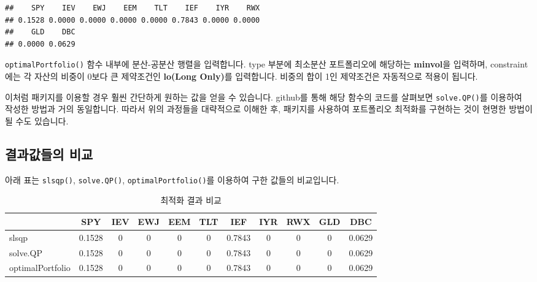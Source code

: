 \documentclass[12pt,]{book}
\newenvironment{Shaded}{\begin{snugshade}}{\end{snugshade}}
\newcommand{\DataTypeTok}[1]{\textcolor[rgb]{0.13,0.29,0.53}{#1}}
\newcommand{\DecValTok}[1]{\textcolor[rgb]{0.00,0.00,0.81}{#1}}
\newcommand{\KeywordTok}[1]{\textcolor[rgb]{0.13,0.29,0.53}{\textbf{#1}}}
\newcommand{\NormalTok}[1]{#1}
\newcommand{\OperatorTok}[1]{\textcolor[rgb]{0.81,0.36,0.00}{\textbf{#1}}}
\newcommand{\StringTok}[1]{\textcolor[rgb]{0.31,0.60,0.02}{#1}}
\begin{document}
\begin{Shaded}
\end{Shaded}

\begin{verbatim}
##    SPY    IEV    EWJ    EEM    TLT    IEF    IYR    RWX 
## 0.1528 0.0000 0.0000 0.0000 0.0000 0.7843 0.0000 0.0000 
##    GLD    DBC 
## 0.0000 0.0629
\end{verbatim}

\texttt{optimalPortfolio()} 함수 내부에 분산-공분산 행렬을 입력합니다. type 부분에 최소분산 포트폴리오에 해당하는 \textbf{minvol}을 입력하며, constraint에는 각 자산의 비중이 0보다 큰 제약조건인 \textbf{lo(Long Only)}를 입력합니다. 비중의 합이 1인 제약조건은 자동적으로 적용이 됩니다.

이처럼 패키지를 이용할 경우 훨씬 간단하게 원하는 값을 얻을 수 있습니다. github를 통해 해당 함수의 코드를 살펴보면 \texttt{solve.QP()}를 이용하여 작성한 방법과 거의 동일합니다. 따라서 위의 과정들을 대략적으로 이해한 후, 패키지를 사용하여 포트폴리오 최적화를 구현하는 것이 현명한 방법이 될 수도 있습니다.

\hypertarget{section-70}{%
\subsection{결과값들의 비교}\label{section-70}}

아래 표는 \texttt{slsqp()}, \texttt{solve.QP()}, \texttt{optimalPortfolio()}를 이용하여 구한 값들의 비교입니다.

\begin{table}[!h]

\caption{\label{tab:unnamed-chunk-18}최적화 결과 비교}
\centering
\fontsize{7}{9}\selectfont
\begin{tabular}{lcccccccccc}
\toprule
  & SPY & IEV & EWJ & EEM & TLT & IEF & IYR & RWX & GLD & DBC\\
\midrule
\rowcolor{gray!6}  slsqp & 0.1528 & 0 & 0 & 0 & 0 & 0.7843 & 0 & 0 & 0 & 0.0629\\
solve.QP & 0.1528 & 0 & 0 & 0 & 0 & 0.7843 & 0 & 0 & 0 & 0.0629\\
\rowcolor{gray!6}  optimalPortfolio & 0.1528 & 0 & 0 & 0 & 0 & 0.7843 & 0 & 0 & 0 & 0.0629\\
\bottomrule
\end{tabular}
\end{table}
\end{document}
